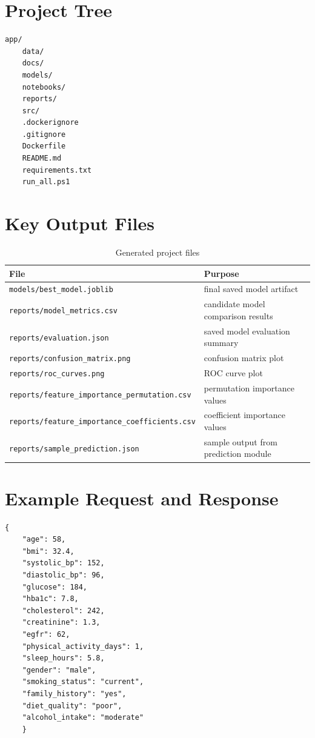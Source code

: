 \documentclass[12pt,a4paper,openany]{report}
\begin{document}
    \chapter{Project Tree}
    \begin{lstlisting}[style=shellstyle,caption={Main project structure}]
    app/
    data/
    docs/
    models/
    notebooks/
    reports/
    src/
    .dockerignore
    .gitignore
    Dockerfile
    README.md
    requirements.txt
    run_all.ps1
    \end{lstlisting}

    \chapter{Key Output Files}
    \begin{table}[H]
    \centering
    \caption{Generated project files}
    \begin{tabularx}{\textwidth}{>{\raggedright\arraybackslash}p{5.3cm} X}
    \toprule
    \textbf{File} & \textbf{Purpose} \\
    \midrule
    \texttt{models/best\_model.joblib} & final saved model artifact \\
    \texttt{reports/model\_metrics.csv} & candidate model comparison results \\
    \texttt{reports/evaluation.json} & saved model evaluation summary \\
    \texttt{reports/confusion\_matrix.png} & confusion matrix plot \\
    \texttt{reports/roc\_curves.png} & ROC curve plot \\
    \texttt{reports/feature\_importance\_permutation.csv} & permutation importance values \\
    \texttt{reports/feature\_importance\_coefficients.csv} & coefficient importance values \\
    \texttt{reports/sample\_prediction.json} & sample output from prediction module \\
    \bottomrule
    \end{tabularx}
    \end{table}

    \chapter{Example Request and Response}
    \begin{lstlisting}[style=jsonstyle,caption={\detokenize{app/request_example.json}}]
    {
    "age": 58,
    "bmi": 32.4,
    "systolic_bp": 152,
    "diastolic_bp": 96,
    "glucose": 184,
    "hba1c": 7.8,
    "cholesterol": 242,
    "creatinine": 1.3,
    "egfr": 62,
    "physical_activity_days": 1,
    "sleep_hours": 5.8,
    "gender": "male",
    "smoking_status": "current",
    "family_history": "yes",
    "diet_quality": "poor",
    "alcohol_intake": "moderate"
    }
    \end{lstlisting}
\end{document}
